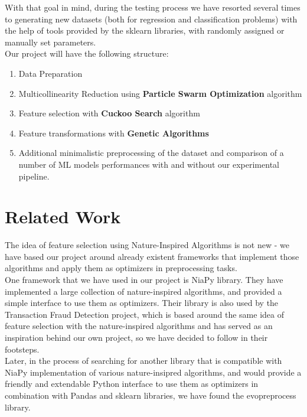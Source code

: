 \documentclass[conference]{IEEEtran}
\begin{document}
With that goal in mind, during the testing process we have resorted several times to generating new datasets (both for regression and classification problems) with the help of tools provided by the sklearn libraries, with randomly assigned or manually set parameters.\\
	
Our project will have the following structure:
\begin{enumerate}
	\item Data Preparation
	\item Multicollinearity Reduction using \textbf{Particle Swarm Optimization} algorithm
	\item Feature selection with \textbf{Cuckoo Search} algorithm
	\item Feature transformations with \textbf{Genetic Algorithms}
	\item Additional minimalistic preprocessing of the dataset and comparison of a number of ML models performances with and without our experimental pipeline.
\end{enumerate}

\section{Related Work}

The idea of feature selection using Nature-Inspired Algorithms is not new - we have based our project around already existent frameworks that implement those algorithms and apply them as optimizers in preprocessing tasks.\\

One framework that we have used in our project is NiaPy library\cite{niapy}. They have implemented a large collection of nature-inspired algorithms, and provided a simple interface to use them as optimizers. Their library is also used by the Transaction Fraud Detection project, which is based around the same idea of feature selection with the nature-inspired algorithms and has served as an inspiration behind our own project, so we have decided to follow in their footsteps.\\

Later, in the process of searching for another library that is compatible with NiaPy implementation of various nature-insipred algorithms, and would provide a friendly and extendable Python interface to use them as optimizers in combination with Pandas and sklearn libraries, we have found the evopreprocess library\cite{evopreproc}. \\
\end{document}

